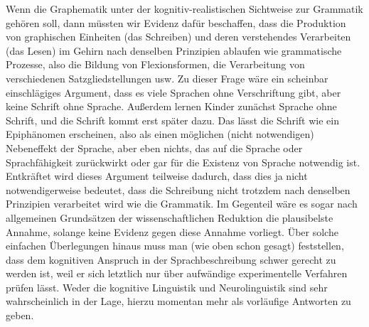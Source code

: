 Wenn die Graphematik unter der kognitiv-realistischen Sichtweise zur Grammatik gehören soll, dann müssten wir Evidenz dafür beschaffen, dass die Produktion von graphischen Einheiten (das Schreiben) und deren verstehendes Verarbeiten (das Lesen) im Gehirn nach denselben Prinzipien ablaufen wie grammatische Prozesse, also die Bildung von Flexionsformen, die Verarbeitung von verschiedenen Satzgliedstellungen usw.
Zu dieser Frage wäre ein scheinbar einschlägiges Argument, dass es viele Sprachen ohne Verschriftung gibt, aber keine Schrift ohne Sprache.
Außerdem lernen Kinder zunächst Sprache ohne Schrift, und die Schrift kommt erst später dazu.
Das lässt die Schrift wie ein Epiphänomen erscheinen, also als einen möglichen (nicht notwendigen) Nebeneffekt der Sprache, aber eben nichts, das auf die Sprache oder Sprachfähigkeit zurückwirkt oder gar für die Existenz von Sprache notwendig ist.
Entkräftet wird dieses Argument teilweise dadurch, dass dies ja nicht notwendigerweise bedeutet, dass die Schreibung nicht trotzdem nach denselben Prinzipien verarbeitet wird wie die Grammatik.
Im Gegenteil wäre es sogar nach allgemeinen Grundsätzen der wissenschaftlichen Reduktion die plausibelste Annahme, solange keine Evidenz gegen diese Annahme vorliegt.
Über solche einfachen Überlegungen hinaus muss man (wie oben schon gesagt) feststellen, dass dem kognitiven Anspruch in der Sprachbeschreibung schwer gerecht zu werden ist, weil er sich letztlich nur über aufwändige experimentelle Verfahren prüfen lässt.
Weder die kognitive Linguistik und Neurolinguistik sind sehr wahrscheinlich in der Lage, hierzu momentan mehr als vorläufige Antworten zu geben.

